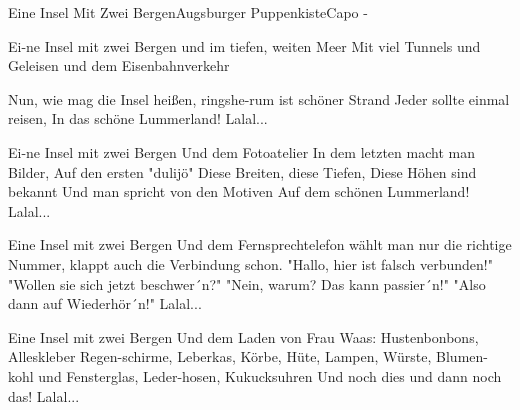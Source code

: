 \begin{song}{Eine Insel Mit Zwei Bergen}{Augsburger Puppenkiste}{Capo -}

Ei-ne Insel mit zwei Bergen
und im tiefen, weiten Meer
Mit viel Tunnels und Geleisen
und dem Eisenbahnverkehr

Nun, wie mag die Insel heißen,
ringshe-rum ist schöner Strand
Jeder sollte einmal reisen,
In das schöne Lummerland!
Lalal...

Ei-ne Insel mit zwei Bergen
Und dem Fotoatelier
In dem letzten macht man Bilder,
Auf den ersten "dulijö"
Diese Breiten, diese Tiefen,
Diese Höhen sind bekannt
Und man spricht von den Motiven
Auf dem schönen Lummerland!
Lalal...

Eine Insel mit zwei Bergen
Und dem Fernsprechtelefon 
wählt man nur die richtige Nummer,
klappt auch die Verbindung schon.
"Hallo, hier ist falsch verbunden!"
"Wollen sie sich jetzt beschwer´n?"
"Nein, warum? Das kann passier´n!"
"Also dann auf Wiederhör´n!"
Lalal...

Eine Insel mit zwei Bergen
Und dem Laden von Frau Waas:
Hustenbonbons, Alleskleber
Regen-schirme, Leberkas,
Körbe, Hüte, Lampen, Würste,
Blumen-kohl und Fensterglas,
Leder-hosen, Kukucksuhren
Und noch dies und dann noch das!
Lalal...
\end{song}
